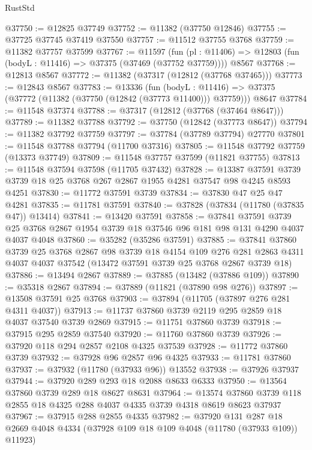 \begin{lexlean}{RustStd}
\begin{coremodule}
@37750 := @12825 @37749
@37752 := @11382 (@37750 @12846)
@37755 := @37725 @37745 @37419 @37550
@37757 := @11512 @37755 @3768
@37759 := @11382 @37757 @37599
@37767 := @11597
    (fun (pl : @11406) => @12803 (fun (bodyL : @11416) => @37375 (@37469 (@37752 @37759))))
    @8567
@37768 := @12813 @8567
@37772 := @11382 (@37317 (@12812 (@37768 @37465)))
@37773 := @12843 @8567
@37783 := @13336
    (fun (bodyL : @11416) => @37375 (@37772 (@11382 (@37750 (@12842 (@37773 @11400))) @37759)))
    @8647
@37784 := @11548 @37374
@37788 := @37317 (@12812 (@37768 (@37464 @8647)))
@37789 := @11382 @37788
@37792 := @37750 (@12842 (@37773 @8647))
@37794 := @11382 @37792 @37759
@37797 := @37784 (@37789 @37794) @27770
@37801 := @11548 @37788 @37794 (@11700 @37316)
@37805 := @11548 @37792 @37759 (@13373 @37749)
@37809 := @11548 @37757 @37599 (@11821 @37755)
@37813 := @11548 @37594 @37598 (@11705 @37432)
@37828 := @13387
    @37591
    @3739
    @3739
    @18
    @25
    @3768
    @267
    @2867
    @1955
    @4281
    @37547
    @98
    @4245
    @8593
    @4251
@37830 := @11772 @37591 @3739
@37834 := @37830 @47 @25 @47 @4281
@37835 := @11781 @37591
@37840 := @37828 (@37834 (@11780 (@37835 @47)) @13414)
@37841 := @13420 @37591
@37858 := @37841
    @37591
    @3739
    @25
    @3768
    @2867
    @1954
    @3739
    @18
    @37546
    @96
    @181
    @98
    @131
    @4290
    @4037
    @4037
    @4048
@37860 := @35282 (@35286 @37591)
@37885 := @37841
    @37860
    @3739
    @25
    @3768
    @2867
    @98
    @3739
    @18
    @4154
    @109
    @276
    @281
    @2863
    @4311
    @4037
    @4037
    @37542
    (@13472 @37591 @3739 @25 @3768 @2867 @3739 @18)
@37886 := @13494 @2867
@37889 := @37885 (@13482 (@37886 @109))
@37890 := @35318 @2867
@37894 := @37889 (@11821 (@37890 @98 @276))
@37897 := @13508 @37591 @25 @3768
@37903 := @37894 (@11705 (@37897 @276 @281 @4311 @4037))
@37913 := @11737 @37860 @3739 @2119 @295 @2859 @18 @4037 @37540 @3739 @2869
@37915 := @11751 @37860 @3739
@37918 := @37915 @295 @2859 @37540
@37920 := @11760 @37860 @3739
@37926 := @37920 @118 @294 @2857 @2108 @4325 @37539
@37928 := @11772 @37860 @3739
@37932 := @37928 @96 @2857 @96 @4325
@37933 := @11781 @37860
@37937 := @37932 (@11780 (@37933 @96)) @13552
@37938 := @37926 @37937
@37944 := @37920 @289 @293 @18 @2088 @8633 @6333
@37950 := @13564 @37860 @3739 @289 @18 @8627 @8631
@37964 := @13574 @37860 @3739 @118 @2855 @18 @4325 @288 @4037 @4335 @3739 @4318 @8619 @8623 @37937
@37967 := @37915 @288 @2855 @4335
@37982 := @37920
    @131
    @287
    @18
    @2669
    @4048
    @4334
    (@37928 @109 @18 @109 @4048 (@11780 (@37933 @109)) @11923)

\end{coremodule}
\end{lexlean}
